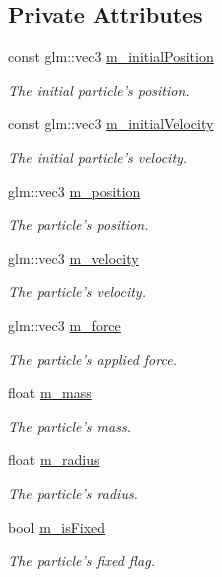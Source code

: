 \subsection*{Private Attributes}
\begin{DoxyCompactItemize}
\item 
const glm\+::vec3 \hyperlink{classParticle_aa6c61c14e6ef274fb54700a5912e78bf}{m\+\_\+initial\+Position}
\begin{DoxyCompactList}\small\item\em The initial particle's position. \end{DoxyCompactList}\item 
const glm\+::vec3 \hyperlink{classParticle_af83d2d60768349ca902f83de1a59e355}{m\+\_\+initial\+Velocity}
\begin{DoxyCompactList}\small\item\em The initial particle's velocity. \end{DoxyCompactList}\item 
glm\+::vec3 \hyperlink{classParticle_ad6daec7ed061255747fbe26ee88429c6}{m\+\_\+position}
\begin{DoxyCompactList}\small\item\em The particle's position. \end{DoxyCompactList}\item 
glm\+::vec3 \hyperlink{classParticle_ae8433e1a1968203478096f319a04e111}{m\+\_\+velocity}
\begin{DoxyCompactList}\small\item\em The particle's velocity. \end{DoxyCompactList}\item 
glm\+::vec3 \hyperlink{classParticle_af4db2db523aa91152dab38bc2ed1e460}{m\+\_\+force}
\begin{DoxyCompactList}\small\item\em The particle's applied force. \end{DoxyCompactList}\item 
float \hyperlink{classParticle_ab78b76aeb4d163132a0c27ea4c5beb75}{m\+\_\+mass}
\begin{DoxyCompactList}\small\item\em The particle's mass. \end{DoxyCompactList}\item 
float \hyperlink{classParticle_af6aee0d324572f74a1bdc28937d04a0b}{m\+\_\+radius}
\begin{DoxyCompactList}\small\item\em The particle's radius. \end{DoxyCompactList}\item 
bool \hyperlink{classParticle_a1a986129338efef4273582fd5ce9eaac}{m\+\_\+is\+Fixed}
\begin{DoxyCompactList}\small\item\em The particle's fixed flag. \end{DoxyCompactList}\end{DoxyCompactItemize}



